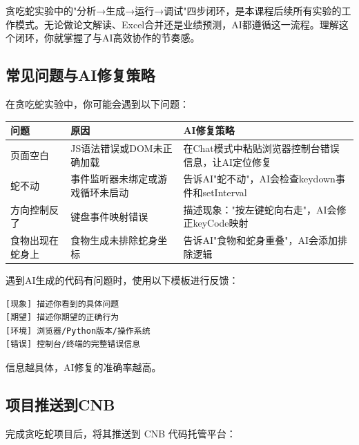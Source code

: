 \begin{theorybox}
贪吃蛇实验中的"分析→生成→运行→调试"四步闭环，是本课程后续所有实验的工作模式。无论做论文解读、Excel合并还是业绩预测，AI都遵循这一流程。理解这个闭环，你就掌握了与AI高效协作的节奏感。
\end{theorybox}

\subsection{常见问题与AI修复策略}

在贪吃蛇实验中，你可能会遇到以下问题：

\begin{table}[H]
\centering
\small
\begin{tabular}{lp{5cm}p{4.5cm}}
\toprule
\textbf{问题} & \textbf{原因} & \textbf{AI修复策略} \\
\midrule
页面空白 & JS语法错误或DOM未正确加载 & 在Chat模式中粘贴浏览器控制台错误信息，让AI定位修复 \\
蛇不动 & 事件监听器未绑定或游戏循环未启动 & 告诉AI"蛇不动"，AI会检查keydown事件和setInterval \\
方向控制反了 & 键盘事件映射错误 & 描述现象："按左键蛇向右走"，AI会修正keyCode映射 \\
食物出现在蛇身上 & 食物生成未排除蛇身坐标 & 告诉AI"食物和蛇身重叠"，AI会添加排除逻辑 \\
\bottomrule
\end{tabular}
\end{table}

\begin{practicebox}[修复策略通用模板]
遇到AI生成的代码有问题时，使用以下模板进行反馈：
\begin{lstlisting}
[现象] 描述你看到的具体问题
[期望] 描述你期望的正确行为
[环境] 浏览器/Python版本/操作系统
[错误] 控制台/终端的完整错误信息
\end{lstlisting}
信息越具体，AI修复的准确率越高。
\end{practicebox}

\subsection{项目推送到CNB}

完成贪吃蛇项目后，将其推送到 CNB 代码托管平台：


